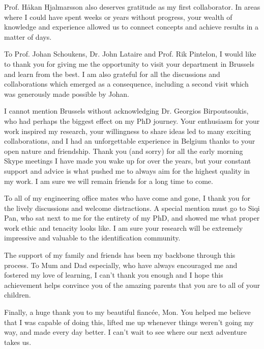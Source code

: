 \documentclass[11pt,twoside]{report}
\begin{document}
Prof. Håkan Hjalmarsson also deserves gratitude as my first collaborator. In areas where I could have spent weeks or years without progress, your wealth of knowledge and experience allowed us to connect concepts and achieve results in a matter of days.

To Prof. Johan Schoukens, Dr. John Lataire and Prof. Rik Pintelon, I would like to thank you for giving me the opportunity to visit your department in Brussels and learn from the best. I am also grateful for all the discussions and collaborations which emerged as a consequence, including a second visit which was generously made possible by Johan.

I cannot mention Brussels without acknowledging Dr. Georgios Birpoutsoukis, who had perhaps the biggest effect on my PhD journey. Your enthusiasm for your work inspired my research, your willingness to share ideas led to many exciting collaborations, and I had an unforgettable experience in Belgium thanks to your open nature and friendship. Thank you (and sorry) for all the early morning Skype meetings I have made you wake up for over the years, but your constant support and advice is what pushed me to always aim for the highest quality in my work. I am sure we will remain friends for a long time to come. 

To all of my engineering office mates who have come and gone, I thank you for the lively discussions and welcome distractions. A special mention must go to Siqi Pan, who sat next to me for the entirety of my PhD, and showed me what proper work ethic and tenacity looks like. I am sure your research will be extremely impressive and valuable to the identification community.

The support of my family and friends has been my backbone through this process. To Mum and Dad especially, who have always encouraged me and fostered my love of learning, I can't thank you enough and I hope this achievement helps convince you of the amazing parents that you are to all of your children. 

Finally, a huge thank you to my beautiful fiancée, Mon. You helped me believe that I was capable of doing this, lifted me up whenever things weren't going my way, and made every day better. I can't wait to see where our next adventure takes us. 

\thispagestyle{plain}
\clearpage
{}
{}
\tableofcontents

\cleardoublepage
\thispagestyle{plain}
\end{document}
